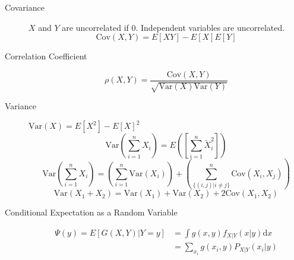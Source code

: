 \documentclass[8pt]{article}
\newcommand{\dd}[1]{\mathrm{d}{#1}}
\begin{document}

\begin{multicols}{2}
  \begin{description}
  \item[Covariance] $X$ and $Y$ are uncorrelated if 0. Independent
    variables are uncorrelated.
    $$\text{Cov}(X,Y)=E[XY]-E[X]E[Y]$$
  \item[Correlation Coefficient]
    $$\rho(X,Y)=\frac{\text{Cov}(X,Y)}{\sqrt{\text{Var}(X)\text{Var}(Y)}}$$
  \item[Variance] $\text{Var}(X) = E[X^2] - E[X]^2$
    $$\text{Var}\left(\sum_{i=1}^{n}X_i\right) =
    E\left(\left[\sum_{i=1}^{n}\tilde{X}_i^2\right]\right)$$
    $$\text{Var}\left(\sum_{i=1}^{n}X_i\right) =
    \left(\sum_{i=1}^{n}\text{Var}(X_i)\right) + \left(\sum_{\{(i,j) |
        i\not= j\}}^{n}\text{Cov}(X_i, X_j)\right)$$
    $$\text{Var}(X_1 + X_2) = \text{Var}(X_1) + \text{Var}(X_2) +
    2\text{Cov}(X_1,X_2)$$
  \item[Conditional Expectation as a Random Variable] 
    \begin{equation*}
      \begin{aligned}
        \Psi(y) = E[G(X,Y)|Y=y] &= \int g(x,y) f_{X|Y}(x|y) \dd{x} \\
        &= \sum_{x_i} g(x_i,y) P_{X|Y}(x_i|y)
      \end{aligned}
    \end{equation*}
  \end{description}
\end{multicols}
\end{document}
